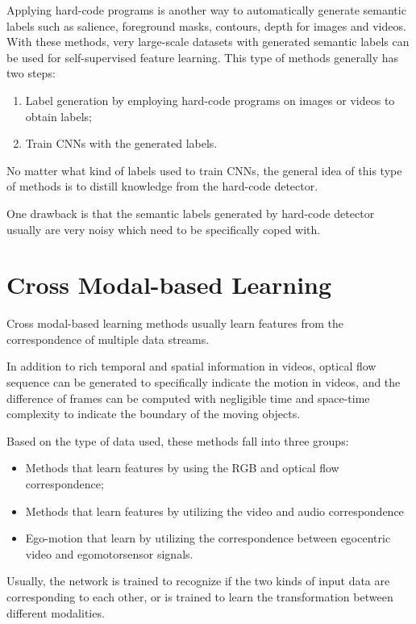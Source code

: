 Applying hard-code programs is another way to automatically generate semantic
labels such as salience, foreground masks, contours, depth for images and videos.
With these methods, very large-scale datasets with generated semantic labels can
be used for self-supervised feature learning. This type of methods generally has
two steps:
\begin{enumerate}
      \item Label generation by employing hard-code programs on images or videos
            to obtain labels;
      \item Train CNNs with the generated labels.
\end{enumerate}

No matter what kind of labels used to train CNNs, the general idea of this type
of methods is to distill knowledge from the hard-code detector.

One drawback is that the semantic labels generated by hard-code detector usually
are very noisy which need to be specifically coped with.
\section{Cross Modal-based Learning}
Cross modal-based learning methods usually learn features from the correspondence
of multiple data streams.

In addition to rich temporal and spatial information in videos, optical flow
sequence can be generated to specifically indicate the motion in videos, and the
difference of frames can be computed with negligible time and space-time complexity
to indicate the boundary of the moving objects.

Based on the type of data used, these methods fall into three groups:
\begin{itemize}
      \item Methods that learn features by using the RGB and optical flow
            correspondence;
      \item Methods that learn features by utilizing the video and audio correspondence
      \item Ego-motion that learn by utilizing the correspondence between egocentric
            video and egomotorsensor signals.
\end{itemize}

Usually, the network is trained to recognize if the two kinds of input data are
corresponding to each other, or is trained to learn the transformation between
different modalities.